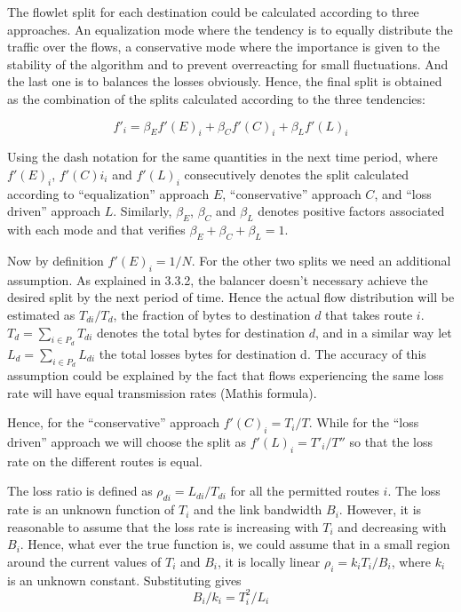 The flowlet split for each destination could be calculated according to three approaches. An equalization mode where the tendency is to equally distribute the traffic over the flows, a conservative mode where the importance is given to the stability of the algorithm and to prevent overreacting for small fluctuations. And the last one is to balances the losses obviously.
Hence, the final split is obtained as the combination of the splits calculated according to the three tendencies:

\begin{equation}
f'_{i} = \beta_{E}f'(E)_{i} + \beta_{C}f'(C)_{i} + \beta_{L}f'(L)_{i}
\end{equation}

Using the dash notation for the same quantities in the next time period, where $f'(E)_{i}$, $f'(C)i_{i}$ and $f'(L)_{i}$ consecutively denotes the split calculated according to “equalization” approach $E$, “conservative” approach $C$, and “loss driven” approach $L$. Similarly, $\beta_{E}$, $\beta_{C}$ and $\beta_{L}$ denotes positive factors associated with each mode and that verifies $\beta_{E}+\beta_{C}+\beta_{L} = 1$. 

Now by definition $f'(E)_{i} = 1/N$. For the other two splits we need an additional assumption. As explained in 3.3.2,  the balancer doesn't necessary achieve the desired split by the next period of time. Hence the actual flow distribution will be estimated as $T_{di}/ T_{d}$, the fraction of bytes to destination $d$ that takes route $i$. $T_{d} = \sum_{i \in P_{d}}T_{di}$ denotes the total bytes for destination $d$,  and in a similar way let $L_{d} = \sum_{i \in P_{d}}L_{di}$ the total losses bytes for destination d. The accuracy of this assumption could be explained by the fact that flows experiencing the same loss rate will have equal transmission rates (Mathis formula).

Hence, for the “conservative” approach $f'(C)_{i} = T_{i}/T$. While for the “loss driven” approach we will choose the split as  $f'(L)_{i} = T'_{i}/T''$ so that the loss rate on the different routes is equal.

The loss ratio is defined as $\rho_{di} = L_{di}/T_{di}$ for all the permitted routes $i.$ The loss rate is an unknown function of $T_{i}$ and the link bandwidth $B_{i}$. However, it is reasonable to assume that the loss rate is increasing with $T_{i}$ and decreasing with $B_{i}$. Hence, what ever the true function is, we could assume that in a small region around the current values of $T_{i}$ and $B_{i}$, it is locally linear $\rho_{i} = k_{i}T_{i}/B_{i}$, where $k_{i}$ is an unknown constant. Substituting gives
\begin{equation}
B_{i}/k_{i} = T_{i}^{2}/L_{i}
\end{equation}

